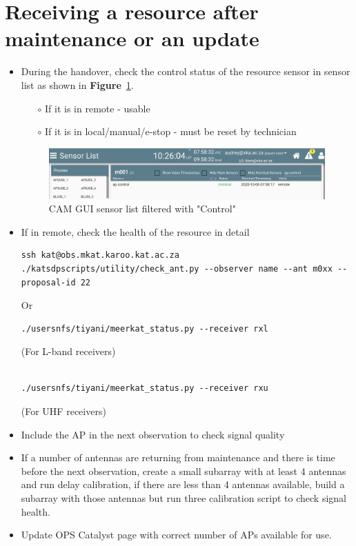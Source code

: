 \section{ Receiving a resource after maintenance or an update}
\begin{itemize}
\item{} During the handover, check the control status of the resource  sensor in sensor list  as shown in \textbf{Figure}~\ref{fig:image98}.

 \begin{itemize}
\item[$\circ$] If it is in remote - usable
\item[$\circ$] If it is in local/manual/e-stop - must be reset by technician
\end{itemize}

\begin{figure}[!thb]
	\centering
	\includegraphics[scale=0.25]{Chapters/images/image98.png}
	
	\caption{CAM GUI sensor list filtered with "Control"}
	\label{fig:image98}
\end{figure}
\item{} If in remote, check the health of the resource in detail

\begin{lstlisting}[style=DOS]
ssh kat@obs.mkat.karoo.kat.ac.za
./katsdpscripts/utility/check_ant.py --observer name --ant m0xx --proposal-id 22

\end{lstlisting}

Or 
\begin{lstlisting}[style=DOS]
./usersnfs/tiyani/meerkat_status.py --receiver rxl     

\end{lstlisting} (For L-band receivers)
\begin{lstlisting}[style=DOS]

./usersnfs/tiyani/meerkat_status.py --receiver rxu     

\end{lstlisting}
 (For UHF receivers)


\item{} Include the AP in the next observation to check signal quality
\item{} If a number of antennas are returning from maintenance and there is time before the next observation, create a small subarray with at least 4 antennas and run delay calibration, if there are less than 4 antennas available, build a subarray with those antennas but run three calibration script to check signal health.
\item{} Update OPS Catalyst page with correct number of APs available for use.


\end{itemize}

